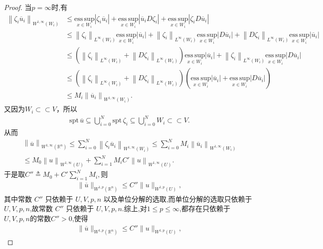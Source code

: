 \documentclass[../../main.tex]{subfiles}%
\begin{document}
\begin{proof}
当$p=\infty$时,有
\begin{align*}
\left\| \zeta _i\overline{u}_i \right\| _{W^{1,\infty}\left( W_i \right)}&\leqslant \underset{x\in W_i}{\mathrm{ess}\,\mathrm{sup}}\left| \zeta _i\overline{u}_i \right|+\underset{x\in W_i}{\mathrm{ess}\,\mathrm{sup}}\left| \overline{u}_iD\zeta _i \right|+\underset{x\in W_i}{\mathrm{ess}\,\mathrm{sup}}\left| \zeta _iD\overline{u}_i \right|
\\
&\leqslant \left\| \zeta _i \right\| _{L^{\infty}\left( W_i \right)}\underset{x\in W_i}{\mathrm{ess}\,\mathrm{sup}}\left| \overline{u}_i \right|+\left\| \zeta _i \right\| _{L^{\infty}\left( W_i \right)}\underset{x\in W_i}{\mathrm{ess}\,\mathrm{sup}}\left| D\overline{u}_i \right|+\left\| D\zeta _i \right\| _{L^{\infty}\left( W_i \right)}\underset{x\in W_i}{\mathrm{ess}\,\mathrm{sup}}\left| \overline{u}_i \right|
\\
&\leqslant \left( \left\| \zeta _i \right\| _{L^{\infty}\left( W_i \right)}+\left\| D\zeta _i \right\| _{L^{\infty}\left( W_i \right)} \right) \underset{x\in W_i}{\mathrm{ess}\,\mathrm{sup}}\left| \overline{u}_i \right|+\left\| \zeta _i \right\| _{L^{\infty}\left( W_i \right)}\underset{x\in W_i}{\mathrm{ess}\,\mathrm{sup}}\left| D\overline{u}_i \right|
\\
&\leqslant \left( \left\| \zeta _i \right\| _{L^{\infty}\left( W_i \right)}+\left\| D\zeta _i \right\| _{L^{\infty}\left( W_i \right)} \right) \left( \underset{x\in W_i}{\mathrm{ess}\,\mathrm{sup}}\left| \overline{u}_i \right|+\underset{x\in W_i}{\mathrm{ess}\,\mathrm{sup}}\left| D\overline{u}_i \right| \right) 
\\
&\leqslant M_{i}\left\| \overline{u}_i \right\| _{W^{1,\infty}\left( W_i \right)}.
\end{align*}
又因为$W_i\subset \subset V$，所以
\begin{align*}
\mathrm{spt}\,\overline{u}\subseteq \bigcup_{i=0}^N{\mathrm{spt}\,\zeta _i}\subseteq \bigcup_{i=0}^N{W_i}\subset \subset V.
\end{align*}
从而
\begin{align*}
\left\| \overline{u} \right\| _{W^{1,\infty}\left( \mathbb{R} ^n \right)}\leqslant \sum_{i=0}^N{\left\| \zeta _i\overline{u}_i \right\| _{W^{1,\infty}\left( W_i \right)}}\leqslant \sum_{i=0}^N{M_{i}}\left\| \overline{u}_i \right\| _{W^{1,\infty}\left( W_i \right)}
\\
\leqslant M_{0}\left\| u \right\| _{W^{1,\infty}\left( U \right)}+\sum_{i=1}^N{M_{i}C\prime}\left\| u \right\| _{W^{1,\infty}\left( U \right)}.
\end{align*}
于是取$C'' \triangleq M_0 + C' \sum\limits_{i=1}^N M_i,$则
\begin{align*}
\|\overline{u}\|_{W^{1,p}(\mathbb{R}^n)}\leqslant C''\|u\|_{W^{1,p}(U)},
\end{align*}
其中常数 \(C''\) 只依赖于 \(U,V,p,n\) 以及单位分解的选取,而单位分解的选取只依赖于\(U,V,p,n\),故常数 \(C''\) 只依赖于 \(U,V,p,n\).综上,对$1\leqslant p\leqslant \infty$,都存在只依赖于 \(U,V,p,n\)的常数$C''>0$,使得
\begin{align}\label{eq::fjiwjio233--12}
\|\overline{u}\|_{W^{1,p}(\mathbb{R}^n)}\leqslant C''\|u\|_{W^{1,p}(U)},
\end{align}


\end{proof}
\end{document}
